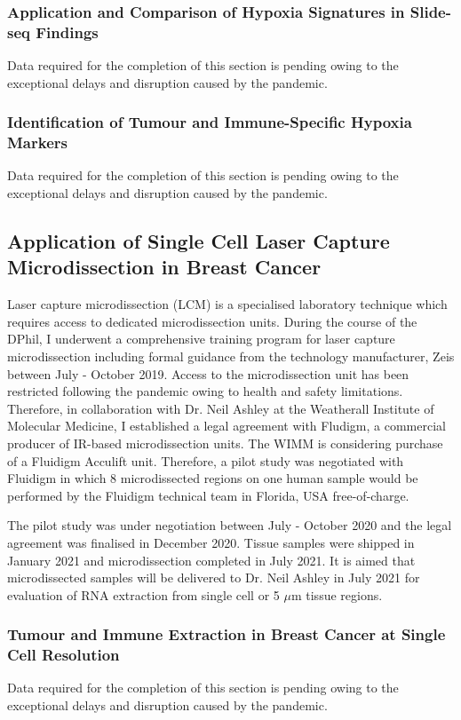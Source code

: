 \subsubsection{Application and Comparison of Hypoxia Signatures in Slide-seq Findings}
Data required for the completion of this section is pending owing to the exceptional delays and disruption caused by the pandemic. 

\subsubsection{Identification of Tumour and Immune-Specific Hypoxia Markers}
Data required for the completion of this section is pending owing to the exceptional delays and disruption caused by the pandemic. 

\subsection{Application of Single Cell Laser Capture Microdissection in Breast Cancer}
Laser capture microdissection (LCM) is a specialised laboratory technique which requires access to dedicated microdissection units. During the course of the DPhil, I underwent a comprehensive training program for laser capture microdissection including formal guidance from the technology manufacturer, Zeis between July - October 2019. Access to the microdissection unit has been restricted following the pandemic owing to health and safety limitations. Therefore, in collaboration with Dr. Neil Ashley at the Weatherall Institute of Molecular Medicine, I established a legal agreement with Fludigm, a commercial producer of IR-based microdissection units. The WIMM is considering purchase of a Fluidigm Acculift unit. Therefore, a pilot study was negotiated with Fluidigm in which 8 microdissected regions on one human sample would be performed by the Fluidigm technical team in Florida, USA free-of-charge.

The pilot study was under negotiation between July - October 2020 and the legal agreement was finalised in December 2020. Tissue samples were shipped in January 2021 and microdissection completed in July 2021. It is aimed that microdissected samples will be delivered to Dr. Neil Ashley in July 2021 for evaluation of RNA extraction from single cell or 5 $\mu$m tissue regions.

\subsubsection{Tumour and Immune Extraction in Breast Cancer at Single Cell Resolution}
Data required for the completion of this section is pending owing to the exceptional delays and disruption caused by the pandemic. 

